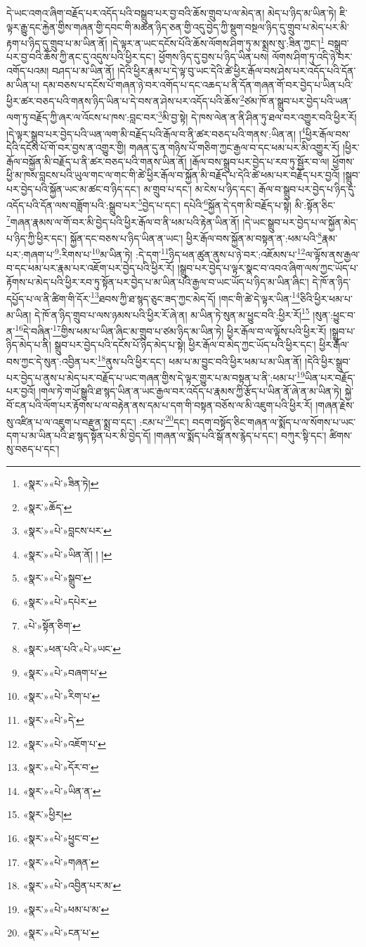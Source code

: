 དེ་ཡང་འགའ་ཞིག་བརྗོད་པར་འདོད་པའི་བསྒྲུབ་པར་བྱ་བའི་ཆོས་གྲུབ་པ་ལ་མེད་ན། མེད་པ་ཉིད་མ་ཡིན་ཏེ། ཇི་ལྟར་རྒྱུ་དང་རྐྱེན་གྱིས་གཞན་གྱི་དབང་གི་མཚན་ཉིད་ཅན་གྱི་འདུ་བྱེད་ཀྱི་སྡུག་བསྔལ་ཉིད་དུ་གྲུབ་པ་མེད་པར་མི་རྟག་པ་ཉིད་དུ་གྲུབ་པ་མ་ཡིན་ནོ། །དེ་ལྟར་ན་ཡང་དངོས་པོའི་ཆོས་ལོགས་ཤིག་ཏུ་མ་སྨྲས་སུ་:ཟིན་ཀྱང་།\footnote{«སྣར་»«པེ་»ཟིན་ཏེ།} བསྒྲུབ་པར་བྱ་བའི་ཆོས་ཀྱི་ནང་དུ་འདུས་པའི་ཕྱིར་དང་། ཕྱོགས་ཉིད་དུ་བྱས་པ་ཉིད་ཡིན་པས། ལོགས་ཤིག་ཏུ་འདི་ཉེ་བར་འགོད་པའམ། བཤད་པ་མ་ཡིན་ནོ། །དེའི་ཕྱིར་རྣམ་པ་དེ་ལྟ་བུ་ཡང་དེའི་ཚེ་ཕྱིར་རྒོལ་བས་ཤེས་པར་འདོད་པའི་དོན་མ་ཡིན་པ། དམ་བཅས་པ་དངོས་པོ་གཞན་ཉེ་བར་འགོད་པ་དང་འཆད་པ་ནི་དོན་གཞན་གོ་བར་བྱེད་པ་ཡིན་པའི་ཕྱིར་ཚར་བཅད་པའི་གནས་ཉིད་ཡིན་པ་དེ་བས་ན་ཤེས་པར་འདོད་པའི་ཆོས་\footnote{«སྣར་»ཆོད་}ཙམ་ཁོ་ན་སྒྲུབ་པར་བྱེད་པའི་ཡན་ལག་ཏུ་བརྗོད་ཀྱི་ཞར་ལ་འོངས་པ་ཁས་:བླང་བར་\footnote{«སྣར་»«པེ་»བླངས་པར་}མི་བྱ་སྟེ། དེ་ཁས་ལེན་ན་ནི་ཤིན་ཏུ་ཐལ་བར་འགྱུར་བའི་ཕྱིར་རོ། །དེ་ལྟར་སྒྲུབ་པར་བྱེད་པའི་ཡན་ལག་མི་བརྗོད་པའི་རྒོལ་བ་ནི་ཚར་བཅད་པའི་གནས་:ཡིན་ན། །\footnote{«སྣར་»«པེ་»ཡིན་ནོ། ། །}ཕྱིར་རྒོལ་བས་དེའི་དངོས་པོ་གོ་བར་བྱས་ན་འགྱུར་གྱི། གཞན་དུ་ན་གཉིས་པོ་གཅིག་ཀྱང་རྒྱལ་བ་དང་ཕམ་པར་མི་འགྱུར་རོ། །ཕྱིར་རྒོལ་བསྐྱོན་མི་བརྗོད་པ་ནི་ཚར་བཅད་པའི་གནས་ཡིན་ནོ། །རྒོལ་བས་སྒྲུབ་པར་བྱེད་པ་རབ་ཏུ་སྦྱོར་བ་ལ། ཕྱོགས་ཕྱི་མ་ཁས་བླངས་པའི་ཡུལ་གང་ལ་གང་གི་ཚེ་ཕྱིར་རྒོལ་བ་སྐྱོན་མི་བརྗོད་པ་དེའི་ཚེ་ཕམ་པར་བརྗོད་པར་བྱའོ། །སྒྲུབ་པར་བྱེད་པའི་སྐྱོན་ཡང་མ་ཚང་བ་ཉིད་དང་། མ་གྲུབ་པ་དང་། མ་ངེས་པ་ཉིད་དང་། རྒོལ་བ་སྒྲུབ་པར་བྱེད་པ་ཉིད་དུ་འདོད་པའི་དོན་ལས་བཟློག་པའི་:སྒྲུབ་པར་\footnote{«སྣར་»«པེ་»སྒྲུབ་}བྱེད་པ་དང་། དཔེའི་\footnote{«སྣར་»«པེ་»དཔེར་}སྐྱོན་དེ་དག་མི་བརྗོད་པ་སྟེ། མི་:སྟོན་ཅིང་\footnote{«པེ་»སྟོན་ཅིག་}གཞན་རྣམས་ལ་གོ་བར་མི་བྱེད་པའི་ཕྱིར་རྒོལ་བ་ནི་ཕམ་པའི་རྟེན་ཡིན་ནོ། །དེ་ཡང་སྒྲུབ་པར་བྱེད་པ་ལ་སྐྱོན་མེད་པ་ཉིད་ཀྱི་ཕྱིར་དང་། སྐྱོན་དང་བཅས་པ་ཉིད་ཡིན་ན་ཡང་། ཕྱིར་རྒོལ་བས་སྐྱོན་མ་བསྟན་ན་:ཕམ་པའི་\footnote{«སྣར་»ཕན་པའི་«པེ་»ཡང་}རྣམ་པར་:གཞག་པ་\footnote{«སྣར་»«པེ་»བཞག་པ་}:རིགས་པ་\footnote{«སྣར་»«པེ་»རིག་པ་}མ་ཡིན་ཏེ། :དེ་དག་\footnote{«སྣར་»«པེ་»དེ་}ཉིད་ཕན་ཚུན་ནུས་པ་ཉེ་བར་:འཇོམས་པ་\footnote{«སྣར་»«པེ་»འཇོག་པ་}ལ་ལྟོས་ནས་རྒྱལ་བ་དང་ཕམ་པར་རྣམ་པར་འཇོག་པར་བྱེད་པའི་ཕྱིར་རོ། །སྒྲུབ་པར་བྱེད་པ་ལྟར་སྣང་བ་འབའ་ཞིག་ལས་ཀྱང་ཡོད་པ་རྟོགས་པ་མེད་པའི་ཕྱིར་རབ་ཏུ་སྟོན་པར་བྱེད་པ་མ་ཡིན་པའི་རྒྱལ་བ་ཡང་ཡོད་པ་ཉིད་མ་ཡིན་ཞིང་། དེ་ཁོ་ན་ཉིད་དཔྱོད་པ་ལ་ནི་ཚིག་གི་དོར་\footnote{«སྣར་»«པེ་»དོར་བ་}ཐབས་ཀྱི་ཐ་སྙད་ཅུང་ཟད་ཀྱང་མེད་དོ། །གང་གི་ཚེ་དེ་ལྟར་ཡིན་\footnote{«སྣར་»«པེ་»ཡིན་ན་}ཅིའི་ཕྱིར་ཕམ་པ་མ་ཡིན། དེ་ཁོ་ན་ཉིད་གྲུབ་པ་ལས་ཉམས་པའི་ཕྱིར་རོ་ཞེ་ན། མ་ཡིན་ཏེ་སུན་མ་ཕྱུང་བའི་:ཕྱིར་རོ།\footnote{«སྣར་»ཕྱིར།} །སུན་:ཕྱུང་བ་ན་\footnote{«སྣར་»«པེ་»ཕྱུང་བ་}དེ་བཞིན་\footnote{«སྣར་»«པེ་»གཞན་}གྱིས་ཕམ་པ་ཡིན་ཞིང་མ་གྲུབ་པ་ཙམ་ཉིད་མ་ཡིན་ཏེ། ཕྱིར་རྒོལ་བ་ལ་ལྟོས་པའི་ཕྱིར་རོ། །སྒྲུབ་པ་ཉིད་མེད་པ་ནི། སྒྲུབ་པར་བྱེད་པའི་དངོས་པོ་ཉིད་མེད་པ་སྟེ། ཕྱིར་རྒོལ་བ་མེད་ཀྱང་ཡོད་པའི་ཕྱིར་དང་། ཕྱིར་རྒོལ་བས་ཀྱང་དེ་སུན་:འབྱིན་པར་\footnote{«སྣར་»«པེ་»འབྱིན་པར་མ་}ནུས་པའི་ཕྱིར་དང་། ཕམ་པ་མ་བྱུང་བའི་ཕྱིར་ཕམ་པ་མ་ཡིན་ནོ། །དེའི་ཕྱིར་སྒྲུབ་པར་བྱེད་པ་ནུས་པ་མེད་པར་བརྗོད་པ་ཡང་གཞན་གྱིས་དེ་ལྟར་གྱུར་པ་མ་བསྟན་པ་ནི་:ཕམ་པ་\footnote{«སྣར་»«པེ་»ཕམ་པ་མ་}ཡིན་པར་བརྗོད་པར་བྱའོ། །གལ་ཏེ་གཡོ་སྒྱུའི་ཐ་སྙད་ཡིན་ན་ཡང་རྒྱལ་བར་འདོད་པ་རྣམས་ཀྱི་རྩོད་པ་ཡིན་ནོ་ཞེ་ན་མ་ཡིན་ཏེ། སྐྱེ་བོ་ངན་པའི་ལོག་པར་རྟོགས་པ་ལ་བརྟེན་ནས་དམ་པ་དག་གི་བསྟན་བཅོས་ལ་མི་འཇུག་པའི་ཕྱིར་རོ། །གཞན་རྗེས་སུ་འཛིན་པ་ལ་འཇུག་པ་བརྫུན་སྨྲ་བ་དང་། :ངམ་པ་\footnote{«སྣར་»«པེ་»ངན་པ་}དང་། བདག་བསྟོད་ཅིང་གཞན་ལ་སྨོད་པ་ལ་སོགས་པ་ཡང་དག་པ་མ་ཡིན་པའི་ཐ་སྙད་སྟོན་པར་མི་བྱེད་དོ། །གཞན་ལ་སྨོད་པའི་སྒོ་ནས་རྙེད་པ་དང་། བཀུར་སྟི་དང་། ཚིགས་སུ་བཅད་པ་དང་། 